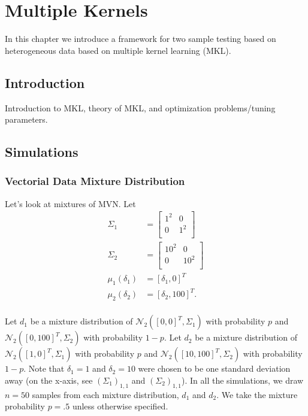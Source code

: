 \graphicspath{{./MKL/img/}}
\chapter{Multiple Kernels}
\label{C:MKL}
In this chapter we introduce a framework for two sample testing based
on heterogeneous data based on multiple kernel learning (MKL).

\section{Introduction}
Introduction to MKL, theory of MKL, and optimization problems/tuning
parameters.  

\section{Simulations}
\subsection{Vectorial Data Mixture Distribution}
Let's look at mixtures of MVN.  Let
\begin{align*}
  \Sigma_1 &=
  \begin{bmatrix}
    1^2 & 0   \\
    0   & 1^2 \\
  \end{bmatrix} \\
  \Sigma_2 &=
  \begin{bmatrix}
    10^2 & 0   \\
    0    & 10^2 \\
  \end{bmatrix} \\
  \mu_1(\delta_1) &= [\delta_1, 0]^T \\
  \mu_2(\delta_2) &= [\delta_2, 100]^T. \\
\end{align*}

Let $d_1$ be a mixture distribution of $\mathcal{N}_2([0, 0]^T, \Sigma_1)$ with
probability $p$ and $\mathcal{N}_2([0, 100]^T, \Sigma_2)$ with
probability $1-p$.  Let $d_2$ be a mixture distribution of
$\mathcal{N}_2([1, 0]^T, \Sigma_1)$ with probability $p$ and
$\mathcal{N}_2([10, 100]^T, \Sigma_2)$ with probability $1-p$.  Note
that $\delta_1 = 1$ and $\delta_2 = 10$ were chosen to be one standard
deviation away (on the x-axis, see $(\Sigma_1)_{1,1}$ and
$(\Sigma_2)_{1,1}$).  In all the simulations, we draw $n = 50$ samples
from each mixture distribution, $d_1$ and $d_2$.  We take the mixture
probability $p = .5$ unless otherwise specified.

